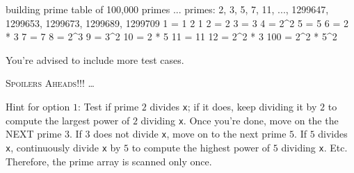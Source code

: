 \nextt
\begin{console}[fontsize=\small,frame=single, commandchars=\\\{\}]
building prime table of 100,000 primes ...
primes: 2, 3, 5, 7, 11, ..., 1299647, 1299653, 1299673, 1299689, 1299709
1 = 1
{2 1}
2 = 2
3 = 3
4 = 2^2
5 = 5
6 = 2 * 3
7 = 7
8 = 2^3
9 = 3^2
10 = 2 * 5
11 = 11
12 = 2^2 * 3
100 = 2^2 * 5^2
\end{console}

You're advised to include more test cases.


\newpage
\textsc{Spoilers Aheads!!! \dots}

Hint for option $1$: Test if prime $2$ divides \verb!x!; if it does, keep
dividing it by $2$ to compute the largest power of $2$ dividing \verb!x!. Once
you're done, move on the the NEXT prime $3$. If $3$ does not divide \verb!x!,
move on to the next prime $5$. If $5$ divides \verb!x!, continuously divide
\verb!x! by $5$ to compute the highest power of $5$ dividing \verb!x!. Etc.
Therefore, the prime array is scanned only once.
